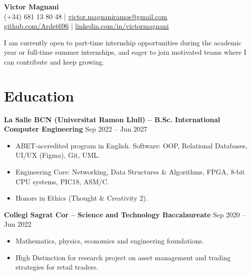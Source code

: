 \documentclass[11pt, a4paper]{article}
\begin{document}
\begin{center}
    {\huge \textbf{Victor Magnani}} \\
    \vspace{4pt}
    (+34) 681 13 80 48 \quad | \quad \href{mailto:victor.magnaniramos@gmail.com}{victor.magnaniramos@gmail.com} \\
    \href{https://github.com/Ardet696}{github.com/Ardet696} \quad | \quad \href{https://linkedin.com/in/victormagnani}{linkedin.com/in/victormagnani}
\end{center}

\vspace{0.3em}
\begin{center}
    {\small I am currently open to part-time internship opportunities during the academic year or full-time summer internships, and eager to join motivated teams where I can contribute and keep growing.}
\end{center}

\section{Education}

\textbf{La Salle BCN (Universitat Ramon Llull) -- B.Sc. International Computer Engineering} \hfill Sep 2022 -- Jun 2027
\begin{itemize}
    \item ABET-accredited program in English. Software: OOP, Relational Databases, UI/UX (Figma), Git, UML.
    \item Engineering Core: Networking, Data Structures \& Algorithms, FPGA, 8-bit CPU systems, PIC18, ASM/C.
    \item Honors in Ethics (Thought \& Creativity 2).
\end{itemize}

\vspace{0.8em}

\textbf{Collegi Sagrat Cor -- Science and Technology Baccalaureate} \hfill Sep 2020 -- Jun 2022
\begin{itemize}
    \item Mathematics, physics, economics and engineering foundations.
    \item High Distinction for research project on asset management and trading strategies for retail traders.
\end{itemize}
\end{document}
